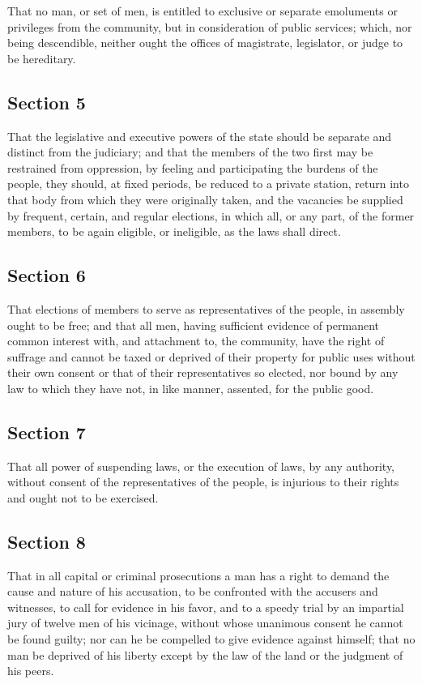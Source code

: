 \documentclass[11pt,a4paper]{article}
\begin{document}
That no man, or set of men, is entitled to exclusive or separate emoluments or privileges from the community, but in consideration of public services; which, nor being descendible, neither ought the offices of magistrate, legislator, or judge to be hereditary.

\subsection*{Section 5}

That the legislative and executive powers of the state should be separate and distinct from the judiciary; and that the members of the two first may be restrained from oppression, by feeling and participating the burdens of the people, they should, at fixed periods, be reduced to a private station, return into that body from which they were originally taken, and the vacancies be supplied by frequent, certain, and regular elections, in which all, or any part, of the former members, to be again eligible, or ineligible, as the laws shall direct.

\subsection*{Section 6}

That elections of members to serve as representatives of the people, in assembly ought to be free; and that all men, having sufficient evidence of permanent common interest with, and attachment to, the community, have the right of suffrage and cannot be taxed or deprived of their property for public uses without their own consent or that of their representatives so elected, nor bound by any law to which they have not, in like manner, assented, for the public good.

\subsection*{Section 7}

That all power of suspending laws, or the execution of laws, by any authority, without consent of the representatives of the people, is injurious to their rights and ought not to be exercised.

\subsection*{Section 8}

That in all capital or criminal prosecutions a man has a right to demand the cause and nature of his accusation, to be confronted with the accusers and witnesses, to call for evidence in his favor, and to a speedy trial by an impartial jury of twelve men of his vicinage, without whose unanimous consent he cannot be found guilty; nor can he be compelled to give evidence against himself; that no man be deprived of his liberty except by the law of the land or the judgment of his peers.
\end{document}
